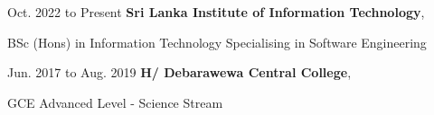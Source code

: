 
\begin{twocolentry}{
      Oct. 2022 to Present
   }
   \textbf{Sri Lanka Institute of Information Technology},\par
   BSc (Hons) in Information Technology Specialising in Software Engineering
\end{twocolentry}

\vspace{0.1 cm}

\begin{twocolentry}{
      Jun. 2017 to Aug. 2019
   }
   \textbf{H/ Debarawewa Central College},\par
   GCE Advanced Level - Science Stream
\end{twocolentry}



